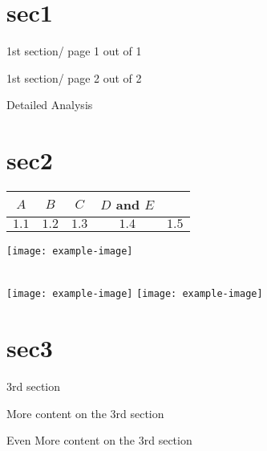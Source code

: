 \documentclass{beamer}
\begin{document}
  \section{sec1}
    \begin{frame}%
    1st section/ page 1 out of 1
    \end{frame}

    \begin{frame}
    1st section/ page 2 out of 2
    \end{frame}

    \begin{frame}[label=Detailed_Analysis]
        Detailed Analysis
    \end{frame}

    \section{sec2}
%
\begin{frame}%
%
\begin{table}
\centering
\begin{tabular}{c|c|c|c|c}
$A$ & $B$ & $C$ & $D$ and $E$  \\\hline
$1.1$ & $1.2$ & $1.3$ & $1.4$ & $1.5$
\end{tabular}
\end{table}
\vspace{-0.5em}
%
\centering
\texttt{[image: example-image]}
\begin{minipage}[b][0.4\textheight][c]{.45\linewidth} \end{minipage}\\[1em]
\texttt{[image: example-image]}\quad
\texttt{[image: example-image]}
\end{frame}

    \section{sec3}
    \begin{frame}
    3rd section
    \end{frame}

    \begin{frame}
    More content on the 3rd section
    \end{frame}

    \begin{frame}
    Even More content on the 3rd section
    \end{frame}
\end{document}
